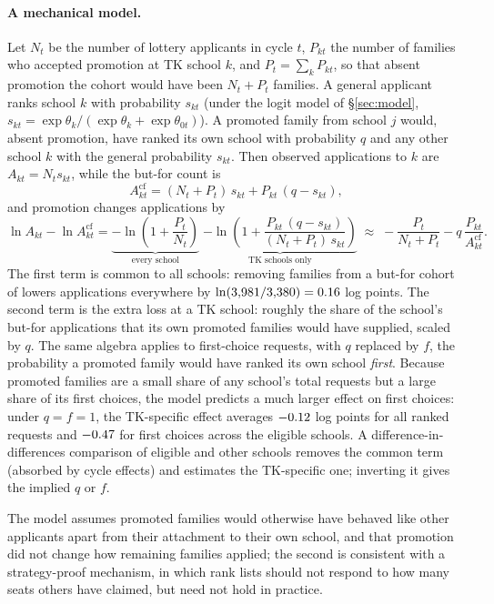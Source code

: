 \documentclass{article}
\begin{document}
\paragraph{A mechanical model.} Let $N_t$ be the number of lottery applicants in cycle $t$, $P_{kt}$ the number of families who accepted promotion at TK school $k$, and $P_t = \sum_k P_{kt}$, so that absent promotion the cohort would have been $N_t + P_t$ families. A general applicant ranks school $k$ with probability $s_{kt}$ (under the logit model of \S\ref{sec:model}, $s_{kt} = \exp\theta_k / (\exp\theta_k + \exp\theta_{0t})$). A promoted family from school $j$ would, absent promotion, have ranked its own school with probability $q$ and any other school $k$ with the general probability $s_{kt}$. Then observed applications to $k$ are $A_{kt} = N_t s_{kt}$, while the but-for count is
\[
A^{\mathrm{cf}}_{kt} = (N_t + P_t)\, s_{kt} + P_{kt}\,(q - s_{kt}),
\]
and promotion changes applications by
\[
\ln A_{kt} - \ln A^{\mathrm{cf}}_{kt} = \underbrace{-\ln\left( 1 + \frac{P_t}{N_t} \right)}_{\text{every school}} \; \underbrace{- \ln\left( 1 + \frac{P_{kt}\,(q - s_{kt})}{(N_t + P_t)\, s_{kt}} \right)}_{\text{TK schools only}} \;\approx\; -\frac{P_t}{N_t + P_t} - q\,\frac{P_{kt}}{A^{\mathrm{cf}}_{kt}} .
\]
The first term is common to all schools: removing \numPromoted{} families from a but-for cohort of \numCohort{} lowers applications everywhere by $\ln(3{,}981/3{,}380) = 0.16$ log points. The second term is the extra loss at a TK school: roughly the share of the school's but-for applications that its own promoted families would have supplied, scaled by $q$. The same algebra applies to first-choice requests, with $q$ replaced by $f$, the probability a promoted family would have ranked its own school \emph{first}. Because promoted families are a small share of any school's total requests but a large share of its first choices, the model predicts a much larger effect on first choices: under $q = f = 1$, the TK-specific effect averages $-0.12$ log points for all ranked requests and $-0.47$ for first choices across the \numEligibleBuildings{} eligible schools. A difference-in-differences comparison of eligible and other schools removes the common term (absorbed by cycle effects) and estimates the TK-specific one; inverting it gives the implied $q$ or $f$.

The model assumes promoted families would otherwise have behaved like other applicants apart from their attachment to their own school, and that promotion did not change how remaining families applied; the second is consistent with a strategy-proof mechanism, in which rank lists should not respond to how many seats others have claimed, but need not hold in practice.
\end{document}
